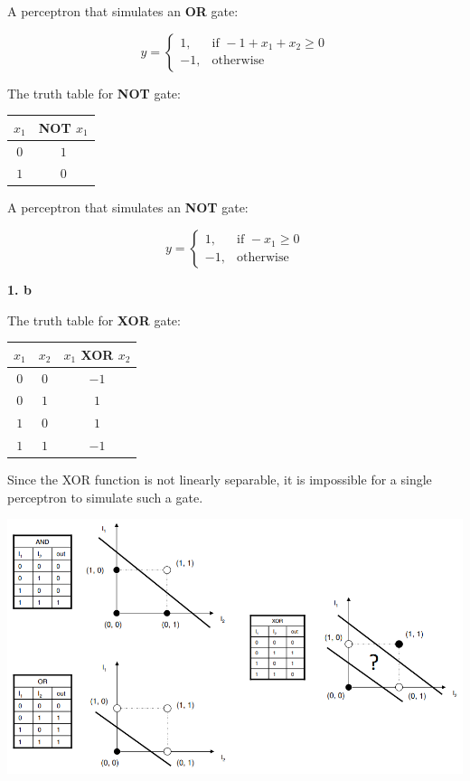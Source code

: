 \documentclass{article}
\begin{document}
A perceptron that simulates an \textbf{OR} gate:

\[
y=
\begin{cases}
    1, & \textrm{if } -1+x_1+x_2\geq 0 \\
    -1, & \textrm{otherwise}
\end{cases}
\]

The truth table for \textbf{NOT} gate:

\begin{table}[h]
    \centering
    \begin{tabular}{c|c}
    \hline
    $x_1$ & NOT $x_1$  \\
    \hline 
    $ 0 $ & $ 1 $ \\
    \hline
    $ 1 $ & $ 0 $ \\
    \hline
    \end{tabular}
\end{table}


A perceptron that simulates an \textbf{NOT} gate:

\[
y=
\begin{cases}
    1, & \textrm{if } -x_1\geq 0 \\
    -1, & \textrm{otherwise}
\end{cases}
\]

\textbf{1. b}

The truth table for \textbf{XOR} gate:

\begin{table}[h]
    \centering
    \begin{tabular}{c|c|c}
    \hline
    $x_1$ & $x_2$ & $x_1$ XOR $x_2$  \\
    \hline 
    $ 0 $ & $ 0 $ & $ -1 $ \\
    \hline
    $ 0 $ & $ 1 $ & $  1 $ \\
    \hline
    $ 1 $ & $ 0 $ & $  1 $ \\
    \hline
    $ 1 $ & $ 1 $ & $ -1 $ \\
    \hline
    \end{tabular}
\end{table}

Since the XOR function is not linearly separable, it is impossible for a single perceptron to simulate such a gate.

\includegraphics[scale=0.5]{logic_gate.png}
\end{document}
